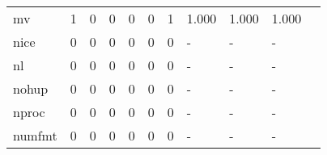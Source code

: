 \begin{longtable}{lp{1.2cm}p{1.2cm}p{1.2cm}p{1.2cm}p{1.2cm}p{1.2cm}p{1.2cm}p{1.2cm}p{1.2cm}p{1.2cm}}
mv        &                                     1 &                                                  0 &                                                  0 &                                                  0 &                                                  0 &                                                  1 &                                              1.000 &                                              1.000 &                                              1.000 \\
nice      &                                     0 &                                                  0 &                                                  0 &                                                  0 &                                                  0 &                                                  0 &                                                  - &                                                  - &                                                  - \\
nl        &                                     0 &                                                  0 &                                                  0 &                                                  0 &                                                  0 &                                                  0 &                                                  - &                                                  - &                                                  - \\
nohup     &                                     0 &                                                  0 &                                                  0 &                                                  0 &                                                  0 &                                                  0 &                                                  - &                                                  - &                                                  - \\
nproc     &                                     0 &                                                  0 &                                                  0 &                                                  0 &                                                  0 &                                                  0 &                                                  - &                                                  - &                                                  - \\
numfmt    &                                     0 &                                                  0 &                                                  0 &                                                  0 &                                                  0 &                                                  0 &                                                  - &                                                  - &                                                  - \\

\end{longtable}
